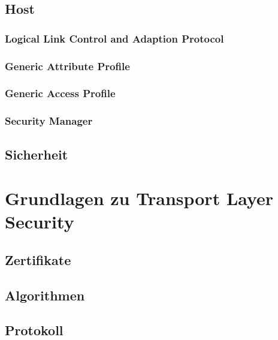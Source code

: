 \documentclass[doktyp=barbeit]{TUBAFarbeiten}
\begin{document}
	\subsection{Host}
		\label{sec: le host}
		

		\subsubsection{Logical Link Control and Adaption Protocol}
			\label{sec: le l2cap}
			

		\subsubsection{Generic Attribute Profile}
			\label{sec: le gatt}
			

		\subsubsection{Generic Access Profile}
			\label{sec: le gap}
			

		\subsubsection{Security Manager}
			\label{sec: le sm}
			

	\subsection{Sicherheit}
		\label{sec: le security}
		

\newpage
\section{Grundlagen zu Transport Layer Security}

	\subsection{Zertifikate}

	\subsection{Algorithmen}

	\subsection{Protokoll}
\end{document}
